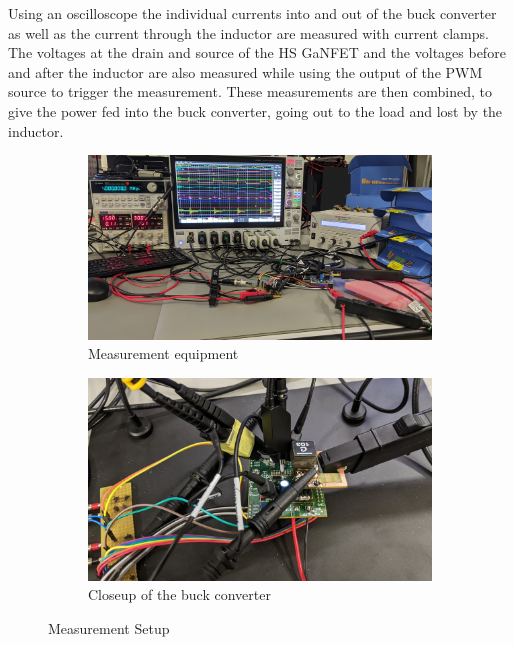 Using an oscilloscope the individual currents into and out of the buck converter as well as the current through the inductor are measured with current clamps. The voltages at the drain and source of the \ac{HS} \ac{GaNFET} and the voltages before and after the inductor are also measured while using the output of the \ac{PWM} source to trigger the measurement. These measurements are then combined, to give the power fed into the buck converter, going out to the load and lost by the inductor. 
\begin{figure}[H]
    \begin{subfigure}[b]{0.50\textwidth}
        \includegraphics[width=\textwidth]{Bilder/Kapitel4/Measurement_Work_Station_cropped.jpg}
        \caption{Measurement equipment}
    \end{subfigure}
    \begin{subfigure}[b]{0.50\textwidth}
        \includegraphics[width=\textwidth]{Bilder/Kapitel4/Measurement_Work_Station_close_cropped.jpg}
        \caption{Closeup of the buck converter}
    \end{subfigure}
    \caption{Measurement Setup}
    \label{fig:hysteresis_comparison}							
\end{figure}
